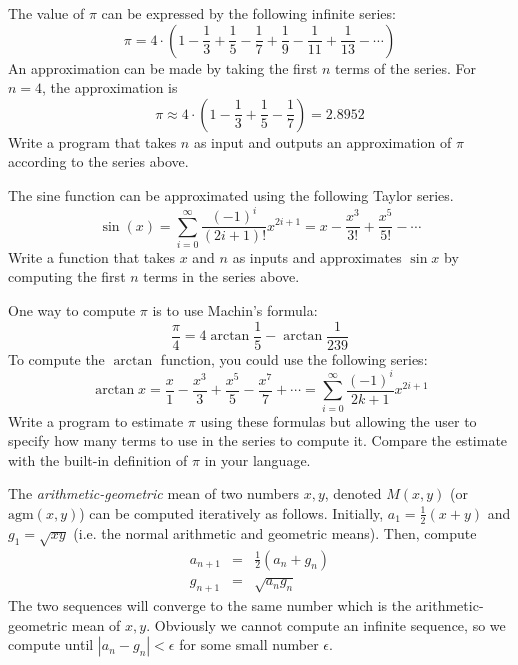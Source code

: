 \begin{exer}
The value of ${\pi}$ can be expressed by the following infinite series:
 $$ {\pi} = 4  \cdot \left( 1 - \frac{1}{3} + \frac{1}{5} - \frac{1}{7} + \frac{1}{9} - \frac{1}{11} + \frac{1}{13} - \cdots \right)$$
An approximation can be made by taking the first $n$ terms of the series.  For $n = 4$, the approximation is
 $$\pi \approx 4 \cdot \left( 1 - \frac{1}{3} + \frac{1}{5} - \frac{1}{7} \right) = 2.8952$$
Write a program that takes $n$ as input and outputs an approximation of $\pi$ according to the
series above.
\end{exer}

\begin{exer}
The sine function can be approximated using the following Taylor series.
  $$\sin{(x)} = \sum_{i=0}^{\infty} \frac{(-1)^i}{(2i+1)!} x^{2i+1} = x - \frac{x^3}{3!} + \frac{x^5}{5!} - \cdots$$
Write a function that takes $x$ and $n$ as inputs and approximates $\sin{x}$ by computing the first $n$
terms in the series above.
\end{exer}

\begin{exer}
One way to compute $\pi$ is to use Machin's formula:
  $$\frac{\pi}{4} = 4 \arctan{\frac{1}{5}} - \arctan{\frac{1}{239}}$$
To compute the $\arctan$ function, you could use the following series:
  $$\arctan{x} = \frac{x}{1} - \frac{x^3}{3} + \frac{x^5}{5} - \frac{x^7}{7} + \cdots = \sum_{i=0}^{\infty} \frac{(-1)^i}{2k+1} x^{2i + 1}$$
Write a program to estimate $\pi$ using these formulas but allowing
the user to specify how many terms to use in the series to compute it.
Compare the estimate with the built-in definition of $\pi$ in your language.  
\end{exer}

\begin{exer}
The \emph{arithmetic-geometric} mean of two numbers $x, y$, denoted $M(x, y)$ 
(or $\mathrm{agm}(x, y)$) can be computed iteratively as follows.  Initially, 
$a_1 = \frac{1}{2}(x + y)$ and $g_1 = \sqrt{xy}$ (i.e. the normal arithmetic and 
geometric means).  Then, compute
  $$\begin{array}{rcl}
    a_{n+1} & = & \frac{1}{2}(a_n+g_n) \\
    g_{n+1} & = & \sqrt{a_n g_n}
    \end{array}$$
The two sequences will converge to the same number which is the arithmetic-geometric 
mean of $x, y$.  Obviously we cannot compute an infinite sequence, so we compute until
$|a_n - g_n| < \epsilon$ for some small number $\epsilon$.
\end{exer}

